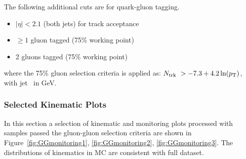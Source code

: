 The following additional cuts are for quark-gluon tagging.
\begin{itemize}
	\item $|\eta| < 2.1$ (both jets) for track acceptance
	\item $\ge 1$ gluon tagged (75\% working point)
	\item 2 gluons tagged (75\% working point)
\end{itemize}
where the 75\% gluon selection criteria is applied as: $N_{\mathrm{trk}}~> -7.3 +
4.2\ln(p_{\mathrm{T}})$, with jet \pt\ in GeV.


\FloatBarrier

%
\subsubsection{Selected Kinematic Plots}

In this section a selection of kinematic and monitoring plots processed with samples passed the gluon-gluon selection criteria are shown in Figure~\ref{fig:GGmonitoring1}, \ref{fig:GGmonitoring2}, \ref{fig:GGmonitoring3}. The distributions of kinematics in MC are consistent with full dataset.

